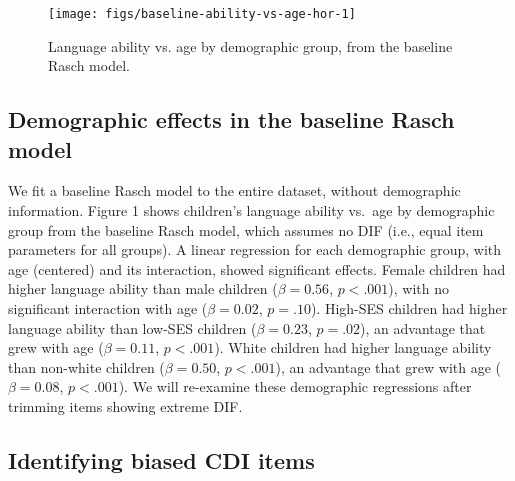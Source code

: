 \documentclass[10pt, letterpaper]{article}
\newenvironment{CodeChunk}{}{}
\begin{document}
\begin{CodeChunk}
\begin{figure}[t]

{\centering \texttt{[image: figs/baseline-ability-vs-age-hor-1]} 

}

\caption[Language ability vs]{Language ability vs. age by demographic group, from the baseline Rasch model.}\label{fig:baseline-ability-vs-age-hor}
\end{figure}
\end{CodeChunk}

\hypertarget{demographic-effects-in-the-baseline-rasch-model}{%
\subsection{Demographic effects in the baseline Rasch
model}\label{demographic-effects-in-the-baseline-rasch-model}}

We fit a baseline Rasch model to the entire dataset, without demographic
information. Figure 1 shows children's language ability vs.~age by
demographic group from the baseline Rasch model, which assumes no DIF
(i.e., equal item parameters for all groups). A linear regression for
each demographic group, with age (centered) and its interaction, showed
significant effects. Female children had higher language ability than
male children (\(\beta=0.56\), \(p<.001\)), with no significant
interaction with age (\(\beta=0.02\), \(p=.10\)). High-SES children had
higher language ability than low-SES children (\(\beta=0.23\),
\(p=.02\)), an advantage that grew with age (\(\beta=0.11\),
\(p<.001\)). White children had higher language ability than non-white
children (\(\beta=0.50\), \(p<.001\)), an advantage that grew with age
(\(\beta=0.08\), \(p<.001\)). We will re-examine these demographic
regressions after trimming items showing extreme DIF.

\hypertarget{identifying-biased-cdi-items}{%
\subsection{Identifying biased CDI
items}\label{identifying-biased-cdi-items}}
\end{document}
